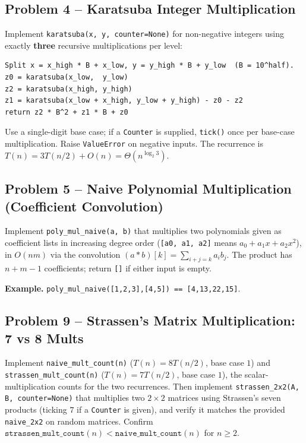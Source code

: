 \documentclass[11pt]{article}
\begin{document}
\subsection*{Problem 4 -- Karatsuba Integer Multiplication}

Implement \texttt{karatsuba(x, y, counter=None)} for non-negative integers using exactly
\textbf{three} recursive multiplications per level:
\begin{verbatim}
Split x = x_high * B + x_low, y = y_high * B + y_low  (B = 10^half).
z0 = karatsuba(x_low,  y_low)
z2 = karatsuba(x_high, y_high)
z1 = karatsuba(x_low + x_high, y_low + y_high) - z0 - z2
return z2 * B^2 + z1 * B + z0
\end{verbatim}
Use a single-digit base case; if a \texttt{Counter} is supplied, \texttt{tick()} once per
base-case multiplication. Raise \texttt{ValueError} on negative inputs. The recurrence is
$T(n) = 3T(n/2) + O(n) = \Theta(n^{\log_2 3})$.

\subsection*{Problem 5 -- Naive Polynomial Multiplication (Coefficient Convolution)}

Implement \texttt{poly\_mul\_naive(a, b)} that multiplies two polynomials given as coefficient
lists in increasing degree order (\texttt{[a0, a1, a2]} means $a_0 + a_1 x + a_2 x^2$), in
$O(nm)$ via the convolution $(a*b)[k] = \sum_{i+j=k} a_i b_j$. The product has $n+m-1$
coefficients; return \texttt{[]} if either input is empty.

\textbf{Example.} \texttt{poly\_mul\_naive([1,2,3],[4,5]) == [4,13,22,15]}.

\subsection*{Problem 9 -- Strassen's Matrix Multiplication: 7 vs 8 Mults}

Implement \texttt{naive\_mult\_count(n)} ($T(n) = 8T(n/2)$, base case $1$) and
\texttt{strassen\_mult\_count(n)} ($T(n) = 7T(n/2)$, base case $1$), the scalar-multiplication
counts for the two recurrences. Then implement \texttt{strassen\_2x2(A, B, counter=None)}
that multiplies two $2 \times 2$ matrices using Strassen's seven products (ticking $7$ if a
\texttt{Counter} is given), and verify it matches the provided \texttt{naive\_2x2} on random
matrices. Confirm $\texttt{strassen\_mult\_count}(n) < \texttt{naive\_mult\_count}(n)$ for
$n \ge 2$.
\end{document}
